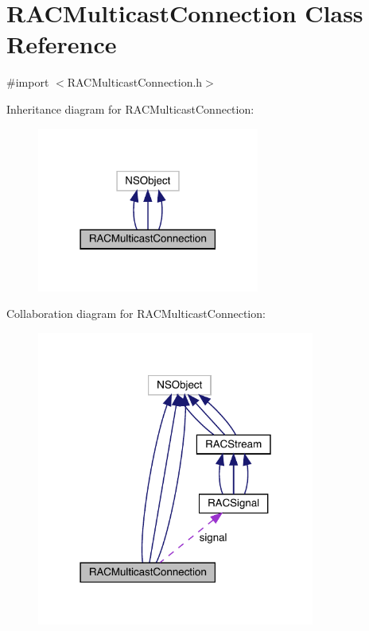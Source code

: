 \hypertarget{interface_r_a_c_multicast_connection}{}\section{R\+A\+C\+Multicast\+Connection Class Reference}
\label{interface_r_a_c_multicast_connection}


{\ttfamily \#import $<$R\+A\+C\+Multicast\+Connection.\+h$>$}



Inheritance diagram for R\+A\+C\+Multicast\+Connection\+:\nopagebreak
\begin{figure}[H]
\begin{center}
\leavevmode
\includegraphics[width=207pt]{interface_r_a_c_multicast_connection__inherit__graph}
\end{center}
\end{figure}


Collaboration diagram for R\+A\+C\+Multicast\+Connection\+:\nopagebreak
\begin{figure}[H]
\begin{center}
\leavevmode
\includegraphics[width=259pt]{interface_r_a_c_multicast_connection__coll__graph}
\end{center}
\end{figure}
